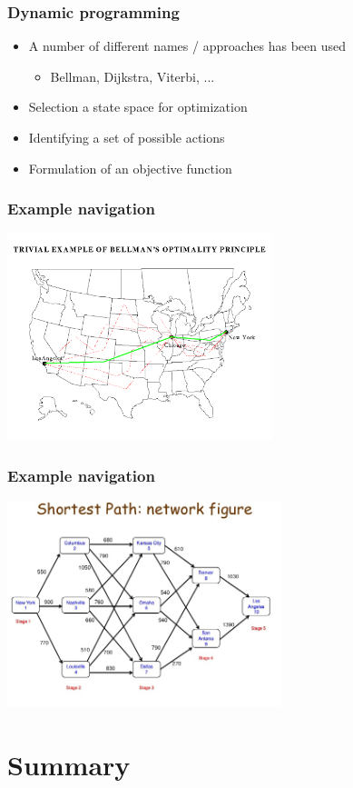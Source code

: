 \documentclass[10pt]{beamer}
\begin{document}
\begin{frame}
  \frametitle{Dynamic programming}
  \begin{itemize}
  \item A number of different names / approaches has been used
    \begin{itemize}
    \item Bellman, Dijkstra, Viterbi, ... 
    \end{itemize}
  \item Selection a state space for optimization
  \item Identifying a set of possible actions
  \item Formulation of an objective function
  \end{itemize}
\end{frame}

\begin{frame}
  \frametitle{Example navigation}
  \centerline{\includegraphics[height=6cm]{routing}}
\end{frame}


\begin{frame}
  \frametitle{Example navigation}
  \centerline{\includegraphics[height=6cm]{dynamic-programming-2}}
\end{frame}

\section{Summary}
\end{document}
